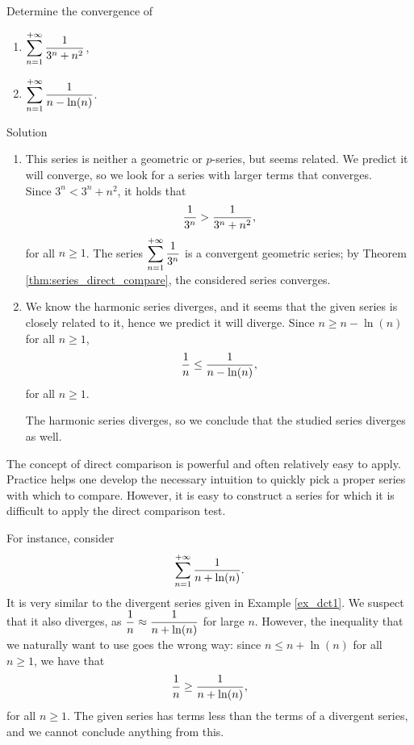 \begin{example}\label{ex_dct1}
Determine the convergence of 
\begin{multicols}{2}
\begin{enumerate}
\item $\displaystyle\sum_{n=1}^{+\infty} \frac1{3^n+n^2}$,
\item $\displaystyle\sum_{n=1}^{+\infty} \frac{1}{n-\ln(n)}$.
\end{enumerate}
\end{multicols}

Solution 

\begin{enumerate}
\item This series is neither a geometric or $p$-series, but seems related. We predict it will converge, so we look for a series with larger terms that converges.\\Since $3^n < 3^n+n^2$, it holds that 
$$\displaystyle \frac1{3^n}> \frac1{3^n+n^2},$$
for all $n\geq1$. The series $\displaystyle\sum_{n=1}^{+\infty} \frac{1}{3^n}$ is a convergent geometric series; by Theorem \ref{thm:series_direct_compare}, the considered series converges.
\item We know the harmonic series diverges, and it seems that the given series is closely related to it, hence we predict it will diverge. Since $n\geq n-\ln (n)$ for all \newline $n\geq 1$, 
$$\displaystyle \frac1n \leq \frac1{n-\ln(n)},$$ 
for all $n\geq 1$. 

The harmonic series diverges, so we conclude that the studied series diverges as well.

\end{enumerate}
\end{example}

The concept of direct comparison is powerful and often relatively easy to apply. Practice helps one develop the necessary intuition to quickly pick a proper series with which to compare. However, it is easy to construct a series for which it is difficult to apply the direct comparison test. 

For instance, consider $$\displaystyle\sum_{n=1}^{+\infty} \frac1{n+\ln(n)}.$$ It is very similar to the divergent series given in Example \ref{ex_dct1}. We suspect that it also diverges, as $\displaystyle\frac 1n \approx \frac1{n+\ln(n)}$ for large $n$. However, the inequality that we naturally want to use goes the wrong way: since $n\leq n+\ln(n)$ for all $n\geq 1$, we have that 
$$\displaystyle\frac1n \geq \frac{1}{n+\ln(n)},$$
for all $n\geq 1$. The given series has terms less than the terms of a divergent series, and we cannot conclude anything from this.

